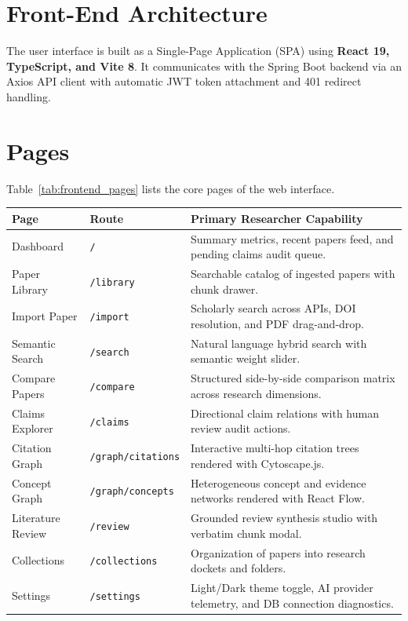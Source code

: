 \documentclass[11pt,a4paper,titlepage]{report}
\begin{document}
\section{Front-End Architecture}
The user interface is built as a Single-Page Application (SPA) using \textbf{React 19, TypeScript, and Vite 8}. It communicates with the Spring Boot backend via an Axios API client with automatic JWT token attachment and 401 redirect handling.

\section{Pages}
Table~\ref{tab:frontend_pages} lists the core pages of the web interface.

\begin{center}
\label{tab:frontend_pages}
\vspace{3pt}
\begin{tabularx}{\textwidth}{llX}
\toprule
\textbf{Page} & \textbf{Route} & \textbf{Primary Researcher Capability} \\
\midrule
Dashboard & \texttt{/} & Summary metrics, recent papers feed, and pending claims audit queue. \\
Paper Library & \texttt{/library} & Searchable catalog of ingested papers with chunk drawer. \\
Import Paper & \texttt{/import} & Scholarly search across APIs, DOI resolution, and PDF drag-and-drop. \\
Semantic Search & \texttt{/search} & Natural language hybrid search with semantic weight slider. \\
Compare Papers & \texttt{/compare} & Structured side-by-side comparison matrix across research dimensions. \\
Claims Explorer & \texttt{/claims} & Directional claim relations with human review audit actions. \\
Citation Graph & \texttt{/graph/citations} & Interactive multi-hop citation trees rendered with Cytoscape.js. \\
Concept Graph & \texttt{/graph/concepts} & Heterogeneous concept and evidence networks rendered with React Flow. \\
Literature Review & \texttt{/review} & Grounded review synthesis studio with verbatim chunk modal. \\
Collections & \texttt{/collections} & Organization of papers into research dockets and folders. \\
Settings & \texttt{/settings} & Light/Dark theme toggle, AI provider telemetry, and DB connection diagnostics. \\
\bottomrule
\end{tabularx}
\end{center}
\end{document}
